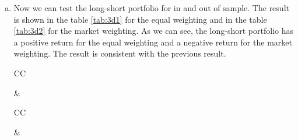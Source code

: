 \begin{enumerate}[(a)]
You can find the result of the test in the table \ref{tab:3c} for CAPM, Fama-French 3 factors, Fama-French 5 factors, Carhart, and HXZ models. 
\begin{table}[htbp!]
    \caption{$\alpha$ test for long-short portfolio with different models}
    \label{tab:3c}
    \begin{tabularx}{\linewidth}{CC}
        \caption*{Equal Weighted }
        
        &
        \caption*{Market Weighted }
        
    \end{tabularx}
\end{table}
\item 
Now we can test the long-short portfolio for in and out of sample. The result is shown in the table \ref{tab:3d1} for the equal weighting and in the table \ref{tab:3d2} for the market weighting. As we can see, the long-short portfolio has a positive return for the equal weighting and a negative return for the market weighting. The result is consistent with the previous result.
\begin{table}[htbp]
    \caption{$\alpha$ test long-short portfolio for in and out of sample with equal weighting}
    \label{tab:3d1}
    \begin{tabularx}{\linewidth}{CC}
        \caption*{Sample period }
        
        &
        \caption*{Post-publication period}
        
    \end{tabularx}
\end{table}

\begin{table}[htbp]
    \caption{$\alpha$ test long-short portfolio for in and out of sample with market weighting}
    \label{tab:3d2}
    \begin{tabularx}{\linewidth}{CC}
        \caption*{Sample period }
        
        &
        \caption*{Post-publication period}
        
    \end{tabularx}
\end{table}


\end{enumerate}